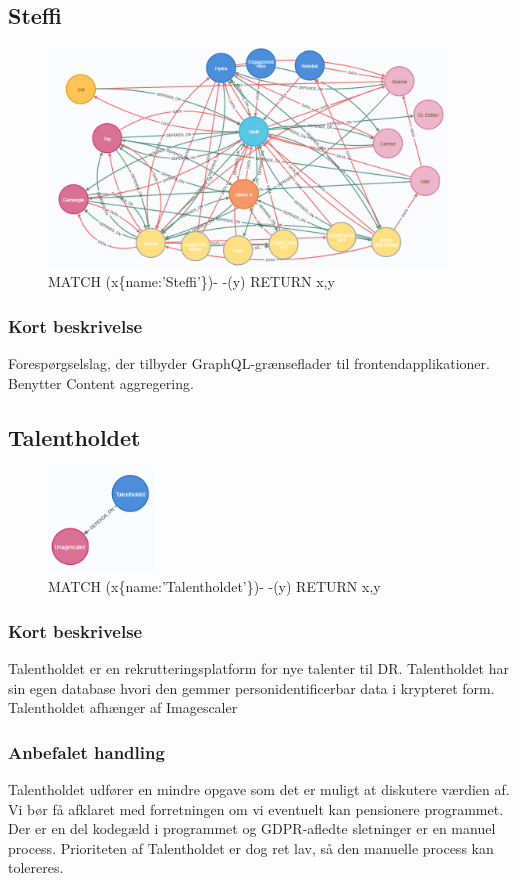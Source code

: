 \documentclass{article}
\begin{document}
\subsection{Steffi}
\begin{figure}[h]
\includegraphics[width=300pt]{Steffi.PNG}
\caption{MATCH (x\{name:'Steffi'\})- -(y) RETURN x,y}
\end{figure}
\subsubsection{Kort beskrivelse}
Forespørgselslag, der tilbyder GraphQL-grænseflader til frontendapplikationer.
Benytter Content aggregering.



\subsection{Talentholdet}
\begin{figure}[h]
\includegraphics[width=80pt]{Talentholdet.PNG}
\caption{MATCH (x\{name:'Talentholdet'\})- -(y) RETURN x,y}
\end{figure}
\subsubsection{Kort beskrivelse}
Talentholdet er en rekrutteringsplatform for nye talenter til DR. Talentholdet har sin egen database hvori den gemmer personidentificerbar data i krypteret form. Talentholdet afhænger af Imagescaler
\subsubsection{Anbefalet handling}
Talentholdet udfører en mindre opgave som det er muligt at diskutere værdien af. Vi bør få afklaret med forretningen om vi eventuelt kan pensionere programmet. Der er en del kodegæld i programmet og GDPR-afledte sletninger er en manuel process.
Prioriteten af Talentholdet er dog ret lav, så den manuelle process kan tolereres.
\end{document}
